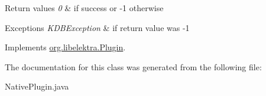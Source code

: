 \begin{DoxyRetVals}{Return values}
{\em 0} & if success or -\/1 otherwise \\
\hline
\end{DoxyRetVals}

\begin{DoxyExceptions}{Exceptions}
{\em K\+D\+B\+Exception} & if return value was -\/1 \\
\hline
\end{DoxyExceptions}


Implements \mbox{\hyperlink{interfaceorg_1_1libelektra_1_1Plugin_a650ce789086f5becf21c5f91fad4c42e}{org.\+libelektra.\+Plugin}}.



The documentation for this class was generated from the following file\+:\begin{DoxyCompactItemize}
\item 
Native\+Plugin.\+java\end{DoxyCompactItemize}

